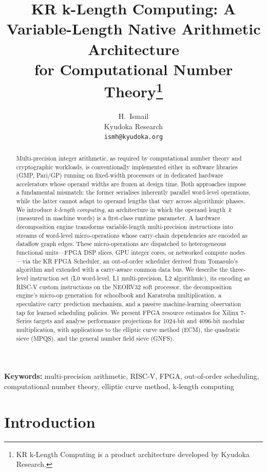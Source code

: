 \documentclass[11pt,a4paper]{article}
\title{KR k-Length Computing: A Variable-Length Native Arithmetic Architecture \\
for Computational Number Theory\footnote{KR k-Length Computing is a product architecture developed by Kyudoka Research.}}
\author{H.\ Ismail \\
  Kyudoka Research \\
  \texttt{ismh@kyudoka.org}}
\date{}
\begin{document}
\maketitle

\begin{abstract}
Multi-precision integer arithmetic, as required by computational number theory
and cryptographic workloads, is conventionally implemented either in software
libraries (GMP, Pari/GP) running on fixed-width processors or in dedicated
hardware accelerators whose operand widths are frozen at design time.  Both
approaches impose a fundamental mismatch: the former serialises inherently
parallel word-level operations, while the latter cannot adapt to operand
lengths that vary across algorithmic phases.  We introduce \emph{k-length
computing}, an architecture in which the operand length~$k$ (measured in
machine words) is a first-class runtime parameter.  A hardware decomposition
engine transforms variable-length multi-precision instructions into streams
of word-level micro-operations whose carry-chain dependencies are encoded as
dataflow graph edges.  These micro-operations are dispatched to heterogeneous
functional units---FPGA DSP slices, GPU integer cores, or networked compute
nodes---via the KR FPGA Scheduler, an out-of-order scheduler derived from
Tomasulo's algorithm and extended with a carry-aware common data bus.  We
describe the three-level instruction set (L0 word-level, L1 multi-precision,
L2 algorithmic), its encoding as RISC-V custom instructions on the NEORV32
soft processor, the decomposition engine's micro-op generation for schoolbook
and Karatsuba multiplication, a speculative carry prediction mechanism, and a
passive machine-learning observation tap for learned scheduling policies.  We
present FPGA resource estimates for Xilinx 7-Series targets and analyse
performance projections for 1024-bit and 4096-bit modular multiplication, with
applications to the elliptic curve method (ECM), the quadratic sieve (MPQS),
and the general number field sieve (GNFS).
\end{abstract}

\vspace{0.5em}
\noindent\textbf{Keywords:} multi-precision arithmetic, RISC-V, FPGA, out-of-order scheduling, computational number theory, elliptic curve method, k-length computing

\section{Introduction}
\label{sec:intro}
\end{document}
